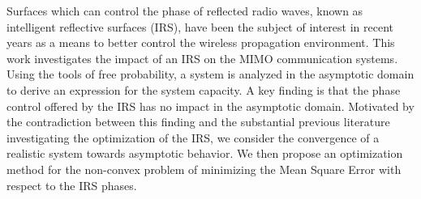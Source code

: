 Surfaces which can control the phase of reflected radio waves, known as intelligent reflective surfaces (IRS), have been the subject of interest in recent years as a means to better control the wireless propagation environment. This work investigates the impact of an IRS on the MIMO communication systems. Using the tools of free probability, a system is analyzed in the asymptotic domain to derive an expression for the system capacity. A key finding is that the phase control offered by the IRS has no impact in the asymptotic domain. Motivated by the contradiction between this finding and the substantial previous literature investigating the optimization of the IRS, we consider the convergence of a realistic system towards asymptotic behavior. We then propose an optimization method for the non-convex problem of minimizing the Mean Square Error with respect to the IRS phases.